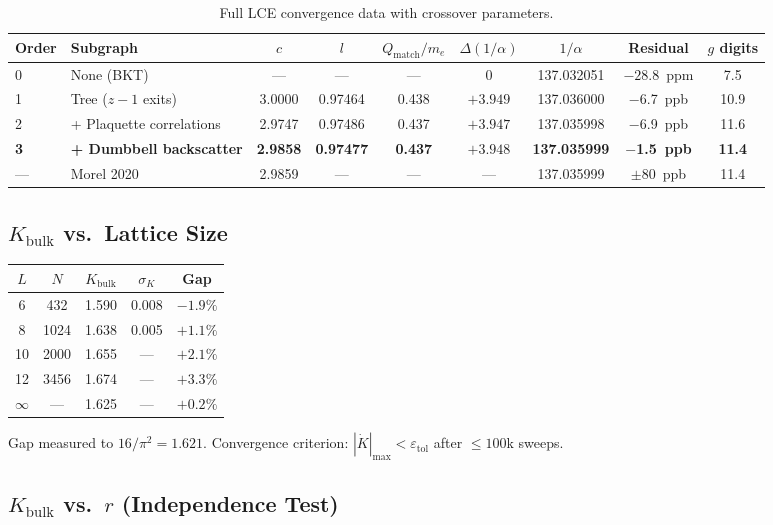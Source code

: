 \documentclass[aps,prd,onecolumn,superscriptaddress,floatfix,12pt]{revtex4-2}
\newcommand{\Kbulk}{K_{\text{bulk}}}
\newcommand{\Qmatch}{Q_{\text{match}}}
\begin{document}
\begin{table}[t]
\caption{Full LCE convergence data with crossover parameters.}
\label{tab:lce-full}
\begin{tabular}{llccccccc}
\toprule
Order & Subgraph & $c$ & $l$ & $\Qmatch/m_e$ & $\Delta(1/\alpha)$ & $1/\alpha$ & Residual & $g$ digits \\
\midrule
0 & None (BKT) & --- & --- & --- & 0 & 137.032051 & $-28.8$~ppm & 7.5 \\
1 & Tree ($z{-}1$ exits) & 3.0000 & 0.97464 & 0.438 & $+3.949$ & 137.036000 & $-$6.7~ppb & 10.9 \\
2 & + Plaquette correlations & 2.9747 & 0.97486 & 0.437 & $+3.947$ & 137.035998 & $-$6.9~ppb & 11.6 \\
\textbf{3} & \textbf{+ Dumbbell backscatter} & \textbf{2.9858} & \textbf{0.97477} & \textbf{0.437} & $\bm{+3.948}$ & \textbf{137.035999} & $\bm{-}$\textbf{1.5~ppb} & \textbf{11.4} \\
--- & Morel 2020~\cite{Morel2020} & 2.9859 & --- & --- & --- & 137.035999 & $\pm$80~ppb & 11.4 \\
\bottomrule
\end{tabular}
\end{table}

\subsection{$\Kbulk$ vs.\ Lattice Size}\label{sec:B2}

\begin{table}[h]
\begin{tabular}{@{}ccccc@{}}
\toprule
$L$ & $N$ & $\Kbulk$ & $\sigma_K$ & Gap \\
\midrule
6 & 432 & 1.590 & 0.008 & $-1.9\%$ \\
8 & 1024 & 1.638 & 0.005 & $+1.1\%$ \\
10 & 2000 & 1.655 & --- & $+2.1\%$ \\
12 & 3456 & 1.674 & --- & $+3.3\%$ \\
$\infty$ & --- & 1.625 & --- & $+0.2\%$ \\
\bottomrule
\end{tabular}
\end{table}

Gap measured to $16/\pi^2 = 1.621$. Convergence criterion: $|\dot{K}|_{\max} < \varepsilon_{\text{tol}}$ after $\leq 100$k sweeps.

\subsection{$\Kbulk$ vs.\ $r$ (Independence Test)}\label{sec:B3}
\end{document}
